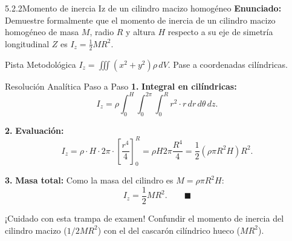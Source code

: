 \documentclass[11pt,a4paper]{article}
\begin{document}
\begin{nivelbox}{5.2.2}{Momento de inercia Iz de un cilindro macizo homogéneo}
\textbf{Enunciado:}\\
Demuestre formalmente que el momento de inercia de un cilindro macizo homogéneo de masa $M$, radio $R$ y altura $H$ respecto a su eje de simetría longitudinal $Z$ es $I_z = \frac{1}{2} M R^2$.

\begin{observacionbox}{Pista Metodológica}
$I_z = \iiint (x^2 + y^2) \rho \, dV$. Pase a coordenadas cilíndricas.
\end{observacionbox}

\begin{ejerciciobox}{Resolución Analítica Paso a Paso}
\smallskip\noindent\textbf{1.} \textbf{Integral en cilíndricas:}
\[I_z = \rho \int_0^H \int_0^{2\pi} \int_0^R r^2 \cdot r \, dr \, d\theta \, dz.\]

\smallskip\noindent\textbf{2.} \textbf{Evaluación:}
\[I_z = \rho \cdot H \cdot 2\pi \cdot \left[ \frac{r^4}{4} \right]_0^R = \rho H 2\pi \frac{R^4}{4} = \frac{1}{2} (\rho \pi R^2 H) R^2.\]

\smallskip\noindent\textbf{3.} \textbf{Masa total:}
Como la masa del cilindro es $M = \rho \pi R^2 H$:
\[I_z = \frac{1}{2} M R^2. \qquad \blacksquare\]
\end{ejerciciobox}

\begin{errorbox}{¡Cuidado con esta trampa de examen!}
Confundir el momento de inercia del cilindro macizo ($1/2 MR^2$) con el del cascarón cilíndrico hueco ($MR^2$).
\end{errorbox}
\end{nivelbox}
\bigskip
\end{document}
